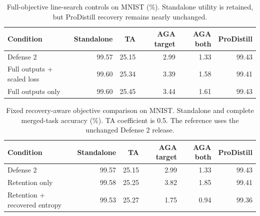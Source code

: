 \begin{table}[t]
\centering
\caption{Full-objective line-search controls on MNIST (\%). Standalone utility is retained, but ProDistill recovery remains nearly unchanged.}
\begin{tabular}{lrrrrr}
\toprule
Condition & Standalone & TA & AGA target & AGA both & ProDistill \\
\midrule
Defense 2 & 99.57 & 25.15 & 2.99 & 1.33 & 99.43 \\
Full outputs + scaled loss & 99.60 & 25.34 & 3.39 & 1.58 & 99.41 \\
Full outputs only & 99.60 & 25.45 & 3.44 & 1.61 & 99.43 \\
\bottomrule
\end{tabular}
\end{table}


\begin{table}[t]
\centering
\caption{Fixed recovery-aware objective comparison on MNIST. Standalone and complete merged-task accuracy (\%). TA coefficient is 0.5. The reference uses the unchanged Defense 2 release.}
\begin{tabular}{lrrrrr}\toprule
Condition & Standalone & TA & AGA target & AGA both & ProDistill \\
\midrule
Defense 2 & 99.57 & 25.15 & 2.99 & 1.33 & 99.43 \\
Retention only & 99.58 & 25.25 & 3.82 & 1.85 & 99.41 \\
Retention + recovered entropy & 99.53 & 25.27 & 1.75 & 0.94 & 99.36 \\
\bottomrule
\end{tabular}
\end{table}
